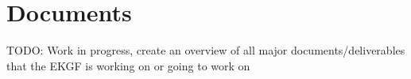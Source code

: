 \chapter{ Documents}\label{ch:ekgf-documents}

TODO: Work in progress, create an overview of all major documents/deliverables that the EKGF is working on or going to work on




